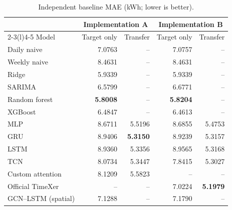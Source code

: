 \begin{table}[t]
\centering\small
\caption{Independent baseline MAE (kWh; lower is better).}\label{tab:baselines}
\begin{tabular*}{\textwidth}{@{\extracolsep{\fill}}lrrrr@{}}\toprule
& \multicolumn{2}{c}{Implementation A} & \multicolumn{2}{c}{Implementation B}\\\cmidrule(lr){2-3}\cmidrule(l){4-5}
Model & Target only & Transfer & Target only & Transfer\\\midrule
Daily naive & 7.0763 & -- & 7.0757 & --\\
Weekly naive & 8.4631 & -- & 8.4631 & --\\
Ridge & 5.9339 & -- & 5.9339 & --\\
SARIMA & 6.5799 & -- & 6.6771 & --\\
Random forest & \textbf{5.8008} & -- & \textbf{5.8204} & --\\
XGBoost & 6.4847 & -- & 6.4613 & --\\
MLP & 8.6711 & 5.5196 & 8.6855 & 5.4753\\
GRU & 8.9406 & \textbf{5.3150} & 8.9239 & 5.3157\\
LSTM & 8.9360 & 5.3356 & 8.9565 & 5.3168\\
TCN & 8.0734 & 5.3447 & 7.8415 & 5.3027\\
Custom attention & 8.1209 & 5.5823 & -- & --\\
Official TimeXer & -- & -- & 7.0224 & \textbf{5.1979}\\
GCN--LSTM (spatial) & 7.1288 & -- & 7.1790 & --\\
\bottomrule\end{tabular*}
\end{table}
